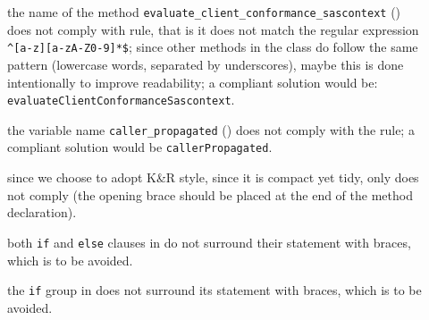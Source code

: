 \begin{description}
	
	\item []
		the name of the method \verb|evaluate_client_conformance_sascontext| () does not comply with rule, that is it does not match the regular expression \verb|^[a-z][a-zA-Z0-9]*$|; since other methods in the class do follow the same pattern (lowercase words, separated by underscores), maybe this is done intentionally to improve readability; a compliant solution would be: \texttt{evaluateClientConformanceSascontext}. %
	
	\item []
		the variable name \verb|caller_propagated| () does not comply with the rule; a compliant solution would be \verb|callerPropagated|. 
	
	\item []
		since we choose to adopt K\&R style, since it is compact yet tidy, only  does not comply (the opening brace should be placed at the end of the method declaration).
		
\end{description}




\begin{description}
	
	\item [] 
		both \verb|if| and \verb|else| clauses in  do not surround their statement with braces, which is to be avoided.

\end{description}


\begin{description}
		
	\item [] 
		the \verb|if| group in  does not surround its statement with braces, which is to be avoided. 

\end{description}

